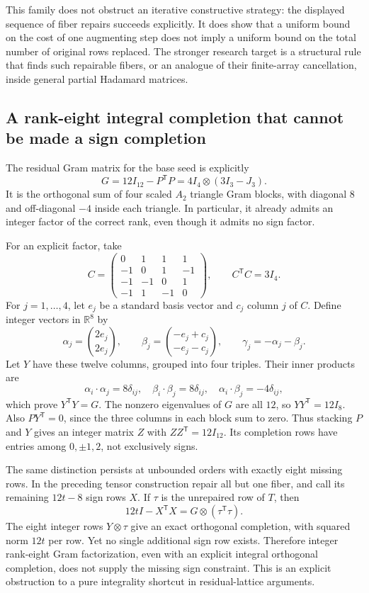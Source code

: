 \documentclass[11pt]{article}
\begin{document}
This family does not obstruct an iterative constructive strategy:
the displayed sequence of fiber repairs succeeds explicitly. It does
show that a uniform bound on the cost of one augmenting step does not
imply a uniform bound on the total number of original rows replaced.
The stronger research target is a structural rule that finds such
repairable fibers, or an analogue of their finite-array cancellation,
inside general partial Hadamard matrices.

\subsection{A rank-eight integral completion that cannot be made a sign completion}
The residual Gram matrix for the base seed is explicitly
\[
 G=12I_{12}-P^{\mathsf T}P
   =4I_4\otimes(3I_3-J_3).
\]
It is the orthogonal sum of four scaled $A_2$ triangle Gram blocks,
with diagonal $8$ and off-diagonal $-4$ inside each triangle.
In particular, it already admits an integer factor of the correct
rank, even though it admits no sign factor.

For an explicit factor, take
\[
 C=\begin{pmatrix}
 0&1&1&1\\-1&0&1&-1\\-1&-1&0&1\\-1&1&-1&0
 \end{pmatrix},\qquad C^{\mathsf T}C=3I_4.
\]
For $j=1,\ldots,4$, let $e_j$ be a standard basis vector and $c_j$
column $j$ of $C$. Define integer vectors in $\mathbb R^8$ by
\[
 \alpha_j=\binom{2e_j}{2e_j},\qquad
 \beta_j=\binom{-e_j+c_j}{-e_j-c_j},\qquad
 \gamma_j=-\alpha_j-\beta_j.
\]
Let $Y$ have these twelve columns, grouped into four triples.
Their inner products are
\[
 \alpha_i\cdot\alpha_j=8\delta_{ij},\quad
 \beta_i\cdot\beta_j=8\delta_{ij},\quad
 \alpha_i\cdot\beta_j=-4\delta_{ij},
\]
which prove $Y^{\mathsf T}Y=G$. The nonzero eigenvalues of $G$ are
all $12$, so $YY^{\mathsf T}=12I_8$. Also $PY^{\mathsf T}=0$,
since the three columns in each block sum to zero. Thus stacking
$P$ and $Y$ gives an integer matrix $Z$ with
$ZZ^{\mathsf T}=12I_{12}$. Its completion rows have entries among
$0,\pm1,2$, not exclusively signs.

The same distinction persists at unbounded orders with exactly eight
missing rows. In the preceding tensor construction repair all but one
fiber, and call its remaining $12t-8$ sign rows $X$. If $\tau$ is the
unrepaired row of $T$, then
\[
 12tI-X^{\mathsf T}X=G\otimes(\tau^{\mathsf T}\tau).
\]
The eight integer rows $Y\otimes\tau$ give an exact orthogonal
completion, with squared norm $12t$ per row. Yet no single additional
sign row exists. Therefore integer rank-eight Gram factorization,
even with an explicit integral orthogonal completion, does not supply
the missing sign constraint. This is an explicit obstruction to a
pure integrality shortcut in residual-lattice arguments.
\end{document}
